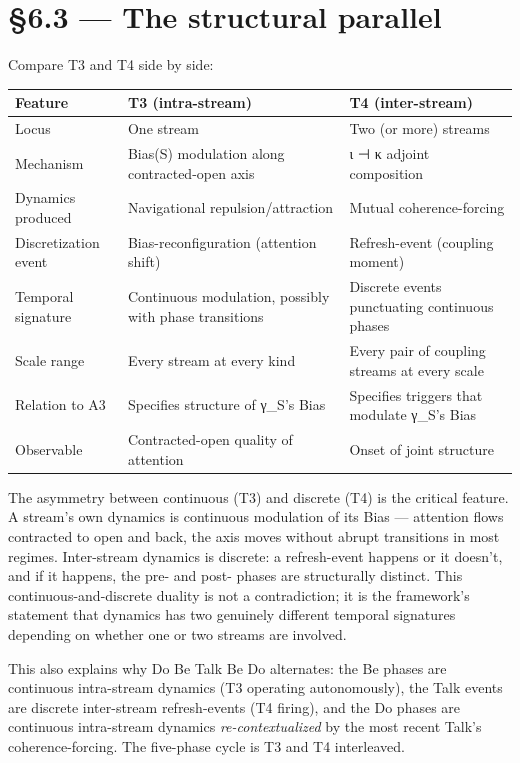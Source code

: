 \documentclass[11pt, openany]{book}
\newcommand{\sectionbreak}{\clearpage}
\begin{document}
\sectionbreak

\section{§6.3 --- The structural parallel}

Compare T3 and T4 side by side:

\begingroup\setlength{\tabcolsep}{3pt}\renewcommand{\arraystretch}{1.15}\footnotesize
\begin{center}
\begin{tabular}{p{0.73in} p{1.97in} p{1.64in}}
\toprule
Feature & T3 (intra-stream) & T4 (inter-stream) \\
\midrule
Locus & One stream & Two (or more) streams \\
Mechanism & Bias(S) modulation along contracted-open axis & ι ⊣ κ adjoint composition \\
Dynamics produced & Navigational repulsion/\allowbreak attraction & Mutual coherence-forcing \\
Discretization event & Bias-reconfiguration (attention shift) & Refresh-event (coupling moment) \\
Temporal signature & Continuous modulation, possibly with phase transitions & Discrete events punctuating continuous phases \\
Scale range & Every stream at every kind & Every pair of coupling streams at every scale \\
Relation to A3 & Specifies structure of γ\_\allowbreak{}S's Bias & Specifies triggers that modulate γ\_\allowbreak{}S's Bias \\
Observable & Contracted-open quality of attention & Onset of joint structure \\
\bottomrule
\end{tabular}
\end{center}
\endgroup
The asymmetry between continuous (T3) and discrete (T4) is the critical feature. A stream's own dynamics is continuous modulation of its Bias --- attention flows contracted to open and back, the axis moves without abrupt transitions in most regimes. Inter-stream dynamics is discrete: a refresh-event happens or it doesn't, and if it happens, the pre- and post- phases are structurally distinct. This continuous-and-discrete duality is not a contradiction; it is the framework's statement that dynamics has two genuinely different temporal signatures depending on whether one or two streams are involved.

This also explains why Do Be Talk Be Do alternates: the Be phases are continuous intra-stream dynamics (T3 operating autonomously), the Talk events are discrete inter-stream refresh-events (T4 firing), and the Do phases are continuous intra-stream dynamics \textit{re-contextualized} by the most recent Talk's coherence-forcing. The five-phase cycle is T3 and T4 interleaved.
\end{document}
